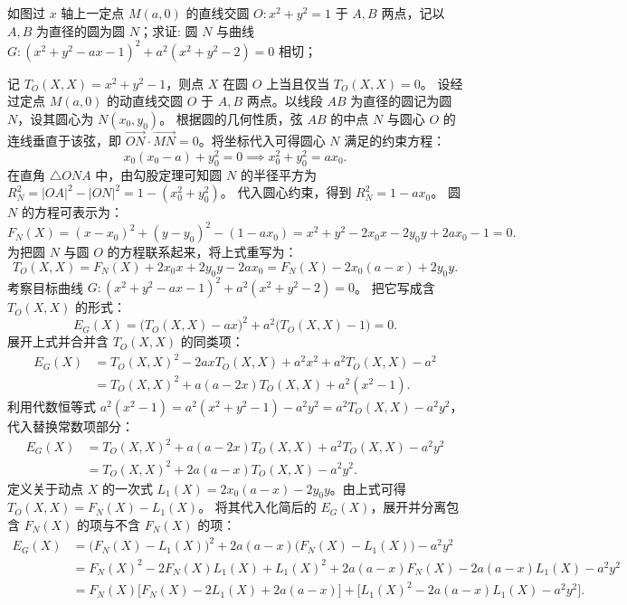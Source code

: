 \begin{example}
如图过 $x$ 轴上一定点 $M(a,0)$ 的直线交圆 $O: x^2 + y^2 = 1$ 于 $A,B$ 两点，记以 $A,B$ 为直径的圆为圆 $N$；求证: 圆 $N$ 与曲线 $G: (x^2 + y^2 - ax - 1)^2 + a^2(x^2 + y^2 - 2) = 0$ 相切；
\end{example}
\begin{solution}
记 $T_O(X, X) = x^2 + y^2 - 1$，则点 $X$ 在圆 $O$ 上当且仅当 $T_O(X, X) = 0$。
设经过定点 $M(a,0)$ 的动直线交圆 $O$ 于 $A, B$ 两点。以线段 $AB$ 为直径的圆记为圆 $N$，设其圆心为 $N(x_0, y_0)$。
根据圆的几何性质，弦 $AB$ 的中点 $N$ 与圆心 $O$ 的连线垂直于该弦，即 $\overrightarrow{ON} \cdot \overrightarrow{MN} = 0$。将坐标代入可得圆心 $N$ 满足的约束方程：
\[ x_0(x_0 - a) + y_0^2 = 0 \implies x_0^2 + y_0^2 = ax_0. \]
在直角 $\triangle ONA$ 中，由勾股定理可知圆 $N$ 的半径平方为 $R_N^2 = |OA|^2 - |ON|^2 = 1 - (x_0^2 + y_0^2)$。
代入圆心约束，得到 $R_N^2 = 1 - ax_0$。
圆 $N$ 的方程可表示为：
\[ F_N(X) = (x-x_0)^2 + (y-y_0)^2 - (1 - ax_0) = x^2 + y^2 - 2x_0 x - 2y_0 y + 2ax_0 - 1 = 0. \]
为把圆 $N$ 与圆 $O$ 的方程联系起来，将上式重写为：
\[ T_O(X, X) = F_N(X) + 2x_0 x + 2y_0 y - 2ax_0 = F_N(X) - 2x_0(a-x) + 2y_0 y. \]
考察目标曲线 $G: (x^2 + y^2 - ax - 1)^2 + a^2(x^2 + y^2 - 2) = 0$。
把它写成含 $T_O(X, X)$ 的形式：
\[ E_G(X) = \big(T_O(X, X) - ax\big)^2 + a^2\big(T_O(X, X) - 1\big) = 0. \]
展开上式并合并含 $T_O(X, X)$ 的同类项：
\begin{align*}
E_G(X) &= T_O(X, X)^2 - 2ax T_O(X, X) + a^2 x^2 + a^2 T_O(X, X) - a^2 \\
&= T_O(X, X)^2 + a(a - 2x)T_O(X, X) + a^2(x^2 - 1).
\end{align*}
利用代数恒等式 $a^2(x^2 - 1) = a^2(x^2 + y^2 - 1) - a^2 y^2 = a^2 T_O(X, X) - a^2 y^2$，代入替换常数项部分：
\begin{align*}
E_G(X) &= T_O(X, X)^2 + a(a - 2x)T_O(X, X) + a^2 T_O(X, X) - a^2 y^2 \\
&= T_O(X, X)^2 + 2a(a - x)T_O(X, X) - a^2 y^2.
\end{align*}
定义关于动点 $X$ 的一次式 $L_1(X) = 2x_0(a - x) - 2y_0 y$。由上式可得 $T_O(X, X) = F_N(X) - L_1(X)$。
将其代入化简后的 $E_G(X)$，展开并分离包含 $F_N(X)$ 的项与不含 $F_N(X)$ 的项：
\begin{align*}
E_G(X) &= \big(F_N(X) - L_1(X)\big)^2 + 2a(a - x)\big(F_N(X) - L_1(X)\big) - a^2 y^2 \\
&= F_N(X)^2 - 2F_N(X)L_1(X) + L_1(X)^2 + 2a(a - x)F_N(X) - 2a(a - x)L_1(X) - a^2 y^2 \\
&= F_N(X)\big[F_N(X) - 2L_1(X) + 2a(a - x)\big] + \big[L_1(X)^2 - 2a(a - x)L_1(X) - a^2 y^2\big].

\end{align*}
\end{solution}
